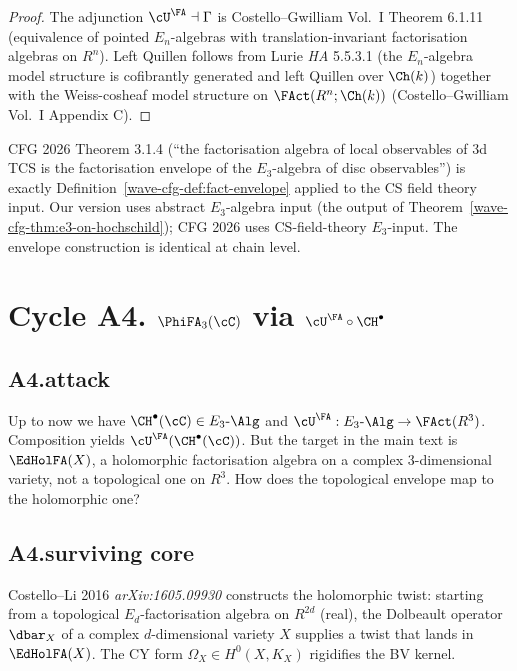 \begin{proof}
The adjunction $\cU^\FA\dashv\Gamma$ is Costello--Gwilliam Vol.~I
Theorem 6.1.11 (equivalence of pointed $E_n$-algebras with
translation-invariant factorisation algebras on $R^n$). Left Quillen
follows from Lurie \emph{HA} 5.5.3.1 (the $E_n$-algebra model structure
is cofibrantly generated and left Quillen over $\Ch(k)$) together with
the Weiss-cosheaf model structure on $\FAct(R^n;\Ch(k))$
(Costello--Gwilliam Vol.~I Appendix C).
\end{proof}

\begin{remark}
\label{wave-cfg-rem:a3-cfg}
CFG 2026 Theorem 3.1.4 (``the factorisation algebra of local
observables of $3$d TCS is the factorisation envelope of the
$E_3$-algebra of disc observables'') is exactly
Definition~\ref{wave-cfg-def:fact-envelope} applied to the
CS field theory input. Our version uses abstract $E_3$-algebra input
(the output of Theorem~\ref{wave-cfg-thm:e3-on-hochschild}); CFG 2026
uses CS-field-theory $E_3$-input. The envelope construction is
identical at chain level.
\end{remark}

\section*{Cycle A4. $\PhiFA_3(\cC)$ via $\cU^\FA\circ\CH^\bullet$}

\subsection*{A4.attack}

Up to now we have $\CH^\bullet(\cC)\in E_3\text{-}\Alg$ and
$\cU^\FA:E_3\text{-}\Alg\to\FAct(R^3)$. Composition yields
$\cU^\FA(\CH^\bullet(\cC))$. But the target in the main text is
$\EdHolFA(X)$, a holomorphic factorisation algebra on a complex
$3$-dimensional variety, not a topological one on $R^3$. How does the
topological envelope map to the holomorphic one?

\subsection*{A4.surviving core}

Costello--Li 2016 \emph{arXiv:1605.09930} constructs the holomorphic
twist: starting from a topological $E_d$-factorisation algebra on
$R^{2d}$ (real), the Dolbeault operator $\dbar_X$ of a complex
$d$-dimensional variety $X$ supplies a twist that lands in
$\EdHolFA(X)$. The CY form $\Omega_X\in H^0(X,K_X)$ rigidifies the BV
kernel.

